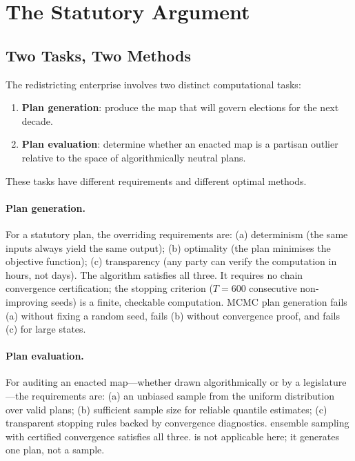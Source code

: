 \section{The Statutory Argument}
\label{sec:statutory}

\subsection{Two Tasks, Two Methods}

The redistricting enterprise involves two distinct computational tasks:

\begin{enumerate}
\item \textbf{Plan generation}: produce the map that will govern elections
      for the next decade.
\item \textbf{Plan evaluation}: determine whether an enacted map is a
      partisan outlier relative to the space of algorithmically neutral plans.
\end{enumerate}

These tasks have different requirements and different optimal methods.

\paragraph{Plan generation.}
For a statutory plan, the overriding requirements are:
(a) determinism (the same inputs always yield the same output);
(b) optimality (the plan minimises the objective function);
(c) transparency (any party can verify the computation in hours, not days).
The \cs{} algorithm satisfies all three.
It requires no chain convergence certification; the stopping criterion
($T = 600$ consecutive non-improving seeds) is a finite, checkable computation.
MCMC plan generation fails (a) without fixing a random seed, fails (b)
without convergence proof, and fails (c) for large states.

\paragraph{Plan evaluation.}
For auditing an enacted map---whether drawn algorithmically or by a
legislature---the requirements are:
(a) an unbiased sample from the uniform distribution over valid plans;
(b) sufficient sample size for reliable quantile estimates;
(c) transparent stopping rules backed by convergence diagnostics.
\recom{} ensemble sampling with certified convergence satisfies all three.
\cs{} is not applicable here; it generates one plan, not a sample.

